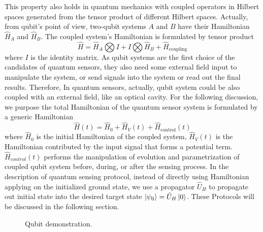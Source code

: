 \documentclass[11pt]{article}
\begin{document}
This property also holds in quantum mechanics with coupled operators in Hilbert spaces generated from the tensor product of different Hilbert spaces. Actually, from qubit's point of view, two-qubit systems $A$ and $B$ have their Hamiltonian $\hat{H}_A$ and $\hat{H}_B$. The coupled system's Hamiltonian is formulated by tensor product
\begin{equation}
	\hat{H} = \hat{H}_A \bigotimes I + I \bigotimes \hat{H}_B + \hat{H}_{\text{coupling}}
\end{equation}
where $I$ is the identity matrix. As qubit systems are the first choice of the candidates of quantum sensors, they also need some external field input to manipulate the system, or send signals into the system or read out the final results. Therefore, In quantum sensors, actually, qubit system could be also coupled with an external field, like an optical cavity. For the following discussion, we purpose the total Hamiltonian of the quantum sensor system is formulated by a generic Hamiltonian
\begin{equation}
	\hat{H}(t) = \hat{H}_0 + \hat{H}_V(t) + \hat{H}_{\text{control}}(t)
\end{equation}
where $\hat{H}_0$ is the initial Hamiltonian of the coupled system, $\hat{H}_V(t)$ is the Hamiltonian contributed by the input signal that forms a potential term. $\hat{H}_{control}(t)$ performs the manipulation of evolution and parametrization of coupled qubit system before, during, or after the sensing process. In the description of quantum sensing protocol, instead of directly using Hamiltonian applying on the initialized ground state, we use a propagator $\hat{U}_H$ to propagate out initial state into the desired target state $\ket{\psi_0} = \hat{U}_H \ket{0}$. These Protocols will be discussed in the following section.

\begin{figure}
	\centering
	\caption{Qubit demonstration.}
\end{figure}
\end{document}
